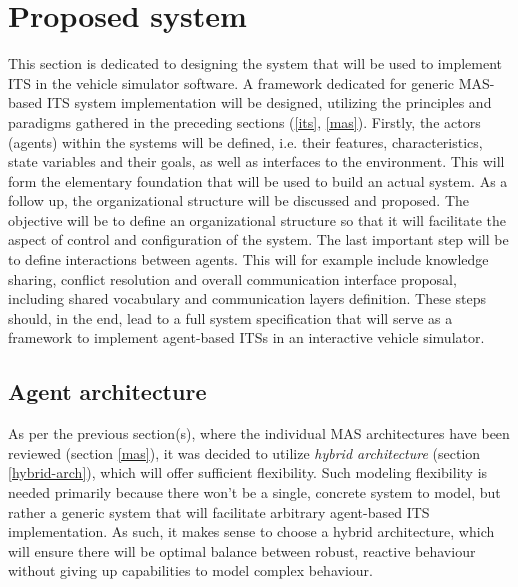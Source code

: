 \documentclass[main.tex]{subfiles}
\begin{document}
    
\section{Proposed system}\label{sec-system}

This section is dedicated to designing the system that will be used to implement ITS in the
vehicle simulator software. A framework dedicated for generic MAS-based ITS system
implementation will be designed, utilizing the principles and paradigms gathered in the
preceding sections (\ref{its}, \ref{mas}). Firstly, the actors (agents) within the systems will
be defined, i.e. their features, characteristics, state variables and their goals, as well as
interfaces to the environment. This will form the elementary foundation that will be used to
build an actual system.  As a follow up, the organizational structure will be discussed and
proposed. The objective will be to define an organizational structure so that it will
facilitate the aspect of control and configuration of the system. The last important step will
be to define interactions between agents.  This will for example include knowledge sharing,
conflict resolution and overall communication interface proposal, including shared vocabulary
and communication layers definition. These steps should, in the end, lead to a full system 
specification that will serve as a framework to implement agent-based ITSs in an interactive 
vehicle simulator.

\subsection{Agent architecture}

As per the previous section(s), where the individual MAS architectures have been reviewed
(section \ref{mas}), it was decided to utilize \emph{hybrid architecture} (section
\ref{hybrid-arch}), which will offer sufficient flexibility. Such modeling flexibility is 
needed primarily because there won't be a single, concrete system to model, but rather a 
generic system that will facilitate arbitrary agent-based ITS implementation. As such, it 
makes sense to choose a hybrid architecture, which will ensure there will be optimal balance 
between robust, reactive behaviour without giving up capabilities to model complex behaviour.


\clearpage
\end{document}
